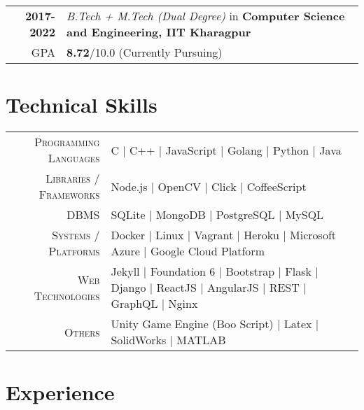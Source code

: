 \documentclass[a4paper,10pt]{extarticle} %
\begin{document}
\begin{tabular}{r|p{17.5cm}}	
\textbf{2017-2022} & \textit{B.Tech + M.Tech (Dual Degree)} in \textbf{Computer Science and Engineering, IIT Kharagpur}\\
\hfill GPA & \textbf{8.72}/10.0 (Currently Pursuing)\\
\end{tabular}


\section{\textcolor{primary}{Technical Skills}}

\begin{tabular}{r|p{15cm}}
\textsc{Programming Languages} & C | C++ | JavaScript | Golang | Python | Java \\
\textsc{Libraries / Frameworks} & Node.js | OpenCV | Click | CoffeeScript \\
\textsc{DBMS} & SQLite | MongoDB | PostgreSQL | MySQL \\
\textsc{Systems / Platforms} & Docker | Linux | Vagrant | Heroku | Microsoft Azure | Google Cloud Platform \\
\textsc{Web Technologies} & Jekyll | Foundation 6 | Bootstrap | Flask | Django | ReactJS | AngularJS | REST | GraphQL | Nginx \\
\textsc{Others} & Unity Game Engine (Boo Script) | Latex | SolidWorks | MATLAB
\end{tabular}


\section{\textcolor{primary}{Experience}}
\end{document}
